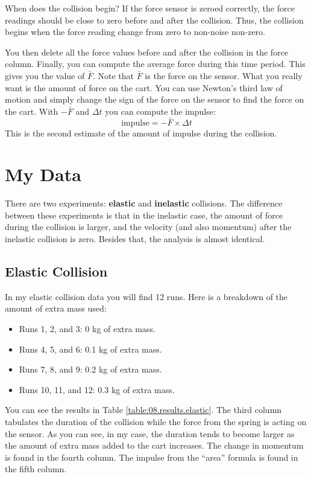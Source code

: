 When does the collision begin? If the force sensor is zeroed correctly, the force readings should be close to zero before and after the collision. Thus, the collision begins when the force reading change from zero to non-noise non-zero.

You then delete all the force values before and after the collision in the force column. Finally, you can compute the average force during this time period. This gives you the value of $\bar{F}$. Note that $\bar{F}$ is the force on the sensor. What you really want is the amount of force on the cart. You can use Newton's third law of motion and simply change the sign of the force on the sensor to find the force on the cart. With $-\bar{F}$ and $\Delta t$ you can compute the impulse:
\begin{equation}
    \text{impulse} = -\bar{F} \times \Delta t
\end{equation}
This is the second estimate of the amount of impulse during the collision.
\section{My Data}
There are two experiments: \textbf{elastic} and \textbf{inelastic} collisions. The difference between these experiments is that in the inelastic case, the amount of force during the collision is larger, and the velocity (and also momentum) after the inelastic collision is zero. Besides that, the analysis is almost identical.
\subsection{Elastic Collision}
In my elastic collision data you will find 12 runs. Here is a breakdown of the amount of extra mass used:
\begin{itemize}
    \item Runs 1, 2, and 3: 0 kg of extra mass.
    \item Runs 4, 5, and 6: 0.1 kg of extra mass.
    \item Runs 7, 8, and 9: 0.2 kg of extra mass.
    \item Runs 10, 11, and 12: 0.3 kg of extra mass.
\end{itemize}
You can see the results in Table \ref{table:08.results.elastic}. The third column tabulates the duration of the collision while the force from the spring is acting on the sensor. As you can see, in my case, the duration tends to become larger as the amount of extra mass added to the cart increases. The change in momentum is found in the fourth column. The impulse from the ``area'' formula is found in the fifth column.

